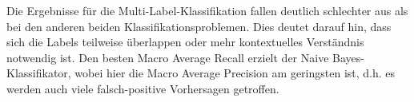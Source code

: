 Die Ergebnisse für die Multi-Label-Klassifikation fallen deutlich schlechter aus als bei den anderen beiden Klassifikationsproblemen. Dies deutet darauf hin, dass sich die Labels teilweise überlappen oder mehr kontextuelles Verständnis notwendig ist. Den besten Macro Average Recall erzielt der Naive Bayes-Klassifikator, wobei hier die Macro Average Precision am geringsten ist, d.h. es werden auch viele falsch-positive Vorhersagen getroffen.
